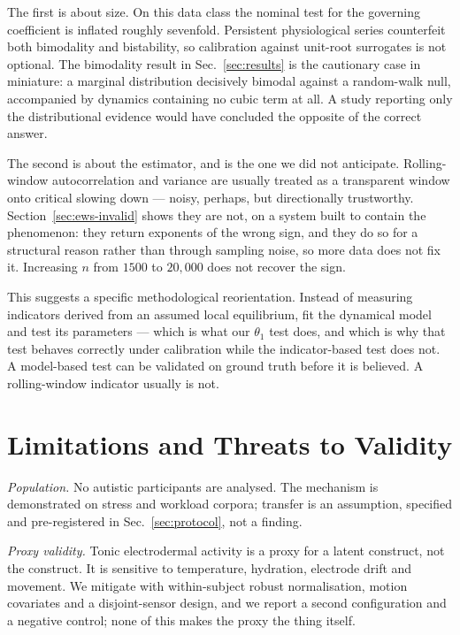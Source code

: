 \documentclass[conference]{IEEEtran}
\begin{document}
The first is about size. On this data class the nominal test for the governing
coefficient is inflated roughly sevenfold. Persistent physiological series
counterfeit both bimodality and bistability, so calibration against unit-root
surrogates is not optional. The bimodality result in Sec.~\ref{sec:results} is
the cautionary case in miniature: a marginal distribution decisively bimodal
against a random-walk null, accompanied by dynamics containing no cubic term at
all. A study reporting only the distributional evidence would have concluded
the opposite of the correct answer.

The second is about the estimator, and is the one we did not anticipate.
Rolling-window autocorrelation and variance are usually treated as a
transparent window onto critical slowing down --- noisy, perhaps, but
directionally trustworthy. Section~\ref{sec:ews-invalid} shows they are not,
on a system built to contain the phenomenon: they return exponents of the wrong
sign, and they do so for a structural reason rather than through sampling
noise, so more data does not fix it. Increasing $n$ from $1500$ to $20{,}000$
does not recover the sign.

This suggests a specific methodological reorientation. Instead of measuring
indicators derived from an assumed local equilibrium, fit the dynamical model
and test its parameters --- which is what our $\theta_1$ test does, and which
is why that test behaves correctly under calibration while the indicator-based
test does not. A model-based test can be validated on ground truth before it is
believed. A rolling-window indicator usually is not.

\section{Limitations and Threats to Validity}

\emph{Population.} No autistic participants are analysed. The mechanism is
demonstrated on stress and workload corpora; transfer is an assumption,
specified and pre-registered in Sec.~\ref{sec:protocol}, not a finding.

\emph{Proxy validity.} Tonic electrodermal activity is a proxy for a latent
construct, not the construct. It is sensitive to temperature, hydration,
electrode drift and movement. We mitigate with within-subject robust
normalisation, motion covariates and a disjoint-sensor design, and we report a
second configuration and a negative control; none of this makes the proxy the
thing itself.
\end{document}
